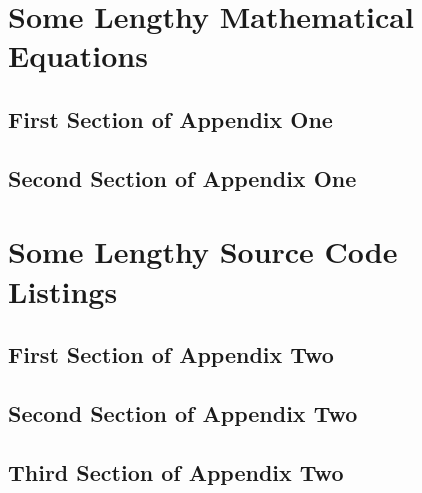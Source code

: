 \chapter{Some Lengthy Mathematical Equations}
\section{First Section of Appendix One}
\section{Second Section of Appendix One}

\chapter{Some Lengthy Source Code Listings}
\section{First Section of Appendix Two}
\section{Second Section of Appendix Two}
\section{Third Section of Appendix Two}